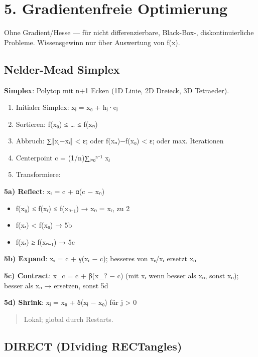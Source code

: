 \documentclass[11pt, a4paper]{article}
\begin{document}
\section{5. Gradientenfreie Optimierung}

Ohne Gradient/Hesse — für nicht differenzierbare, Black-Box-, diskontinuierliche Probleme. Wissensgewinn nur über Auswertung von f(x⃗).



\subsection{Nelder-Mead Simplex}

\textbf{Simplex}: Polytop mit n+1 Ecken (1D Linie, 2D Dreieck, 3D Tetraeder).


\begin{enumerate}
  \item Initialer Simplex: x⃗ⱼ = x⃗₀ + hⱼ·e⃗ⱼ
  \item Sortieren: f(x⃗₀) ≤ … ≤ f(x⃗ₙ)
  \item Abbruch: ∑‖x⃗ⱼ−x⃗ᵢ‖ < ε; oder f(x⃗ₙ)−f(x⃗₀) < ε; oder max. Iterationen
  \item Centerpoint c⃗ = (1/n)∑ⱼ₌₀ⁿ⁻¹ x⃗ⱼ
  \item Transformiere:
\end{enumerate}

\textbf{5a) Reflect}: x⃗ᵣ = c⃗ + α(c⃗ − x⃗ₙ)

\begin{itemize}
  \item f(x⃗₀) ≤ f(x⃗ᵣ) ≤ f(x⃗ₙ₋₁) → x⃗ₙ = x⃗ᵣ, zu 2
  \item f(x⃗ᵣ) < f(x⃗₀) → 5b
  \item f(x⃗ᵣ) ≥ f(x⃗ₙ₋₁) → 5c
\end{itemize}

\textbf{5b) Expand}: x⃗ₑ = c⃗ + γ(x⃗ᵣ − c⃗); besseres von x⃗ₑ/x⃗ᵣ ersetzt x⃗ₙ


\textbf{5c) Contract}: x⃗\_c = c⃗ + β(x\_? − c⃗) (mit x⃗ᵣ wenn besser als x⃗ₙ, sonst x⃗ₙ); besser als x⃗ₙ → ersetzen, sonst 5d


\textbf{5d) Shrink}: x⃗ⱼ = x⃗₀ + δ(x⃗ⱼ − x⃗₀) für j > 0


\begin{quote}
Lokal; global durch Restarts.
\end{quote}


\subsection{DIRECT (DIviding RECTangles)}
\end{document}
